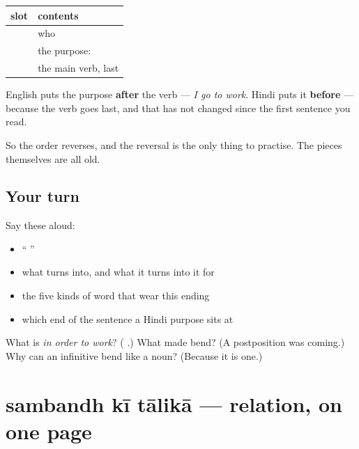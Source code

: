 \begin{grammarlens}[title={Grammar Lens: where the purpose goes}]
\noindent
\begin{tabularx}{\linewidth}{@{}>{\raggedright\arraybackslash}X>{\raggedright\arraybackslash}X@{}}
\toprule
\textbf{slot} & \textbf{contents} \\
\midrule
1 & who \\
2 & the purpose: \textbf{\hi{काम} \hi{करने} \hi{के} \hi{लिए}} \\
3 & the main verb, last \\
\bottomrule
\end{tabularx}

English puts the purpose \textbf{after} the verb — \emph{I go to work}. Hindi puts it \textbf{before} — because the verb goes last, and that has not changed since the first sentence you read.

So the order reverses, and the reversal is the only thing to practise. The pieces themselves are all old.
\end{grammarlens}

\subsection*{Your turn}
Say these aloud:

\begin{itemize}
\raggedright
  \item \textquotedblleft{}      \textquotedblright{}
  \item what \textbf{} turns into, and what it turns into it for
  \item the five kinds of word that wear this ending
  \item which end of the sentence a Hindi purpose sits at
\end{itemize}

\begin{tcolorbox}[breakable,colback=teal!4,colframe=teal!35!black,title={Before you move on}]
What is \emph{in order to work}? (\textbf{   }.) What made \textbf{} bend? (A postposition was coming.) Why can an infinitive bend like a noun? (Because it is one.)
\end{tcolorbox}
\section[\texorpdfstring{\hi{संबंध} \hi{की} \hi{तालिका} (sambandh kī tālikā)}{संबंध की तालिका (sambandh kī tālikā)}]{sambandh kī tālikā — relation, on one page}

